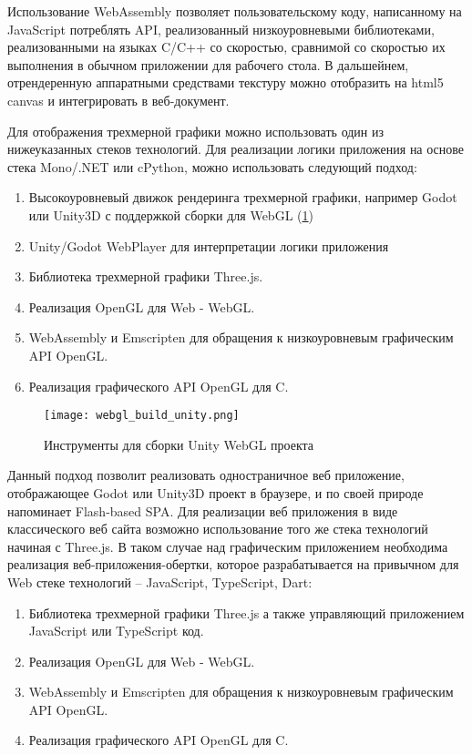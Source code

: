 Использование WebAssembly позволяет пользовательскому коду, написанному на JavaScript потреблять API, реализованный низкоуровневыми библиотеками, реализованными
на языках C/C++ со скоростью, сравнимой со скоростью их выполнения в обычном приложении для рабочего стола. В дальшейнем, отрендеренную аппаратными средствами
текстуру можно отобразить на html5 canvas и интегрировать в веб-документ.

Для отображения трехмерной графики можно использовать один из нижеуказанных стеков технологий.
Для реализации логики приложения на основе стека Mono/.NET или cPython, можно использовать следующий подход:
\begin{enumerate}[label=\arabic*.]
\item Высокоуровневый движок рендеринга трехмерной графики, например Godot или Unity3D с поддержкой сборки для WebGL (\ref{figure:domain:webgl})
\item Unity/Godot WebPlayer для интерпретации логики приложения 
\item Библиотека трехмерной графики Three.js.
\item Реализация OpenGL для Web - WebGL.
\item WebAssembly и Emscripten для обращения к низкоуровневым графическим API OpenGL.
\item Реализация графического API OpenGL для C.
\end{enumerate}

\begin{figure}[ht]
\centering
  \texttt{[image: webgl\_build\_unity.png]}
  \caption{Инструменты для сборки Unity WebGL проекта}
  \label{figure:domain:webgl}
\end{figure}

Данный подход позволит реализовать одностраничное веб приложение, отображающее Godot или Unity3D проект в браузере, и по своей природе напоминает Flash-based SPA.
Для реализации веб приложения в виде классического веб сайта возможно использование того же стека технологий начиная с Three.js. В таком случае над графическим
приложением необходима реализация веб-приложения-обертки, которое разрабатывается на привычном для Web стеке технологий -- JavaScript, TypeScript, Dart:
\begin{enumerate}[label=\arabic*.]
\item Библиотека трехмерной графики Three.js а также управляющий приложением JavaScript или TypeScript код.
\item Реализация OpenGL для Web - WebGL.
\item WebAssembly и Emscripten для обращения к низкоуровневым графическим API OpenGL.
\item Реализация графического API OpenGL для C.
\end{enumerate}

